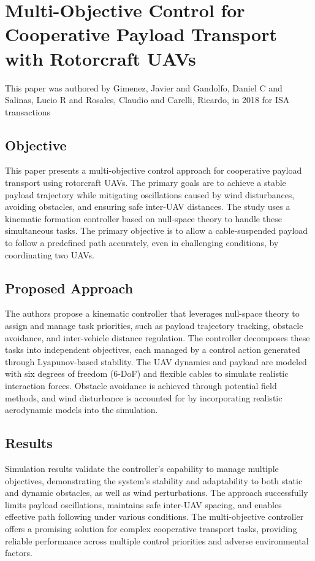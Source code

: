\documentclass[a4paper,12pt]{article}
\begin{document}
\section{Multi-Objective Control for Cooperative Payload Transport with Rotorcraft UAVs}

This paper\cite{gimenez2018multi} was authored by Gimenez, Javier and Gandolfo, Daniel C and Salinas, Lucio R and Rosales, Claudio and Carelli, Ricardo, in 2018 for ISA transactions

\subsection{Objective}
This paper presents a multi-objective control approach for cooperative payload transport using rotorcraft UAVs. The primary goals are to achieve a stable payload trajectory while mitigating oscillations caused by wind disturbances, avoiding obstacles, and ensuring safe inter-UAV distances. The study uses a kinematic formation controller based on null-space theory to handle these simultaneous tasks. The primary objective is to allow a cable-suspended payload to follow a predefined path accurately, even in challenging conditions, by coordinating two UAVs.

\subsection{Proposed Approach}
The authors propose a kinematic controller that leverages null-space theory to assign and manage task priorities, such as payload trajectory tracking, obstacle avoidance, and inter-vehicle distance regulation. The controller decomposes these tasks into independent objectives, each managed by a control action generated through Lyapunov-based stability. The UAV dynamics and payload are modeled with six degrees of freedom (6-DoF) and flexible cables to simulate realistic interaction forces. Obstacle avoidance is achieved through potential field methods, and wind disturbance is accounted for by incorporating realistic aerodynamic models into the simulation.

\subsection{Results}
Simulation results validate the controller's capability to manage multiple objectives, demonstrating the system’s stability and adaptability to both static and dynamic obstacles, as well as wind perturbations. The approach successfully limits payload oscillations, maintains safe inter-UAV spacing, and enables effective path following under various conditions. The multi-objective controller offers a promising solution for complex cooperative transport tasks, providing reliable performance across multiple control priorities and adverse environmental factors.
\end{document}
